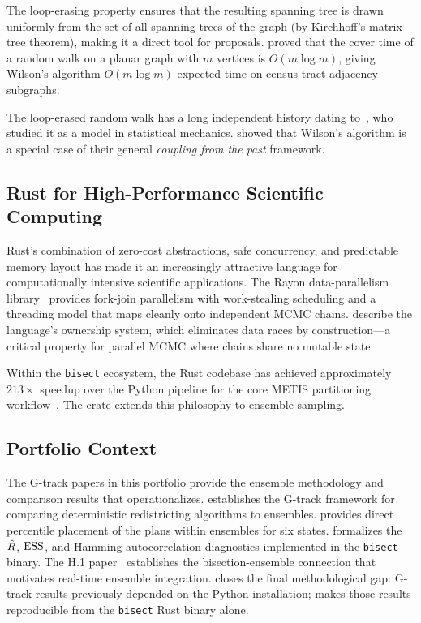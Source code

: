 The loop-erasing property ensures that the resulting spanning tree is
drawn uniformly from the set of all spanning trees of the graph (by
Kirchhoff's matrix-tree theorem), making it a direct tool for \recom{}
proposals.
\citet{aldous1991random} proved that the cover time of a random walk on
a planar graph with $m$ vertices is $O(m\log m)$, giving Wilson's
algorithm $O(m\log m)$ expected time on census-tract adjacency subgraphs.

The loop-erased random walk has a long independent history
dating to~\citet{lawler1980loop}, who studied it as a model in
statistical mechanics.
\citet{propp1998exact} showed that Wilson's algorithm is a special case
of their general \emph{coupling from the past} framework.

\subsection{Rust for High-Performance Scientific Computing}

Rust's combination of zero-cost abstractions, safe concurrency, and
predictable memory layout has made it an increasingly attractive language
for computationally intensive scientific applications.
The Rayon data-parallelism library~\citep{rayon2024} provides
fork-join parallelism with work-stealing scheduling and a threading model
that maps cleanly onto independent MCMC chains.
\citet{matsakis2014rust} describe the language's ownership system, which
eliminates data races by construction---a critical property for parallel
MCMC where chains share no mutable state.

Within the \texttt{bisect} ecosystem, the Rust codebase has achieved
approximately $213\times$ speedup over the Python pipeline for the core
METIS partitioning workflow~\citep{dellaLibera2026b1}.
The \re{} crate extends this philosophy to ensemble sampling.

\subsection{Portfolio Context}

The G-track papers in this portfolio provide the ensemble methodology and
comparison results that \re{} operationalizes.
\citet{dellaLibera2026g0} establishes the G-track framework for comparing
deterministic redistricting algorithms to \gc{} ensembles.
\citet{dellaLibera2026g1} provides direct percentile placement of the
\ar{} plans within \gc{} ensembles for six states.
\citet{dellaLibera2026g4} formalizes the $\hat{R}$, $\mathrm{ESS}$, and Hamming
autocorrelation diagnostics implemented in the \texttt{bisect} binary.
The H.1 paper~\citep{dellaLibera2026h1} establishes the bisection-ensemble
connection that motivates real-time ensemble integration.
\re{} closes the final methodological gap: G-track results previously
depended on the Python \gc{} installation; \re{} makes those results
reproducible from the \texttt{bisect} Rust binary alone.
